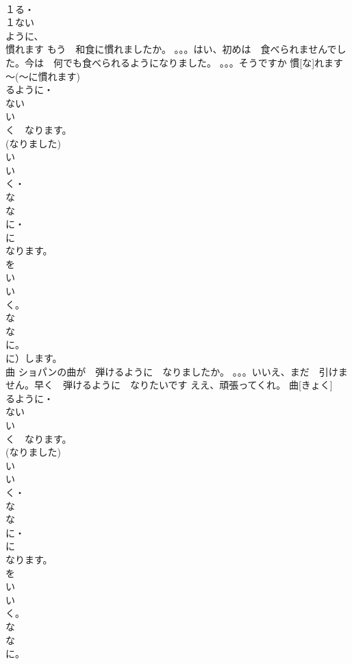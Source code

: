 \documentclass[8pt]{extreport}
\begin{document}
\begin{CJK}{UTF8}{min}
\\	１る・
\\	１ない
\\	ように、
\\	慣れます	もう　和食に慣れましたか。 。。。はい、初めは　食べられませんでした。今は　何でも食べられるようになりました。 。。。そうですか	慣[な]れます			
\\	～(～に慣れます)	
\\	るように・
\\	ない
\\	い　
\\	く　なります。
\\	(なりました) 
\\	い
\\	い
\\	く・
\\	な
\\	な
\\	に・
\\	に　
\\	なります。
\\	を
\\	い
\\	い
\\	く。
\\	な
\\	な
\\	に。
\\	に）します。
\\	曲	ショパンの曲が　弾けるように　なりましたか。 。。。いいえ、まだ　引けません。早く　弾けるように　なりたいです ええ、頑張ってくれ。	曲[きょく]			
\\	るように・
\\	ない
\\	い　
\\	く　なります。
\\	(なりました) 
\\	い
\\	い
\\	く・
\\	な
\\	な
\\	に・
\\	に　
\\	なります。
\\	を
\\	い
\\	い
\\	く。
\\	な
\\	な
\\	に。

\end{CJK}
\end{document}
